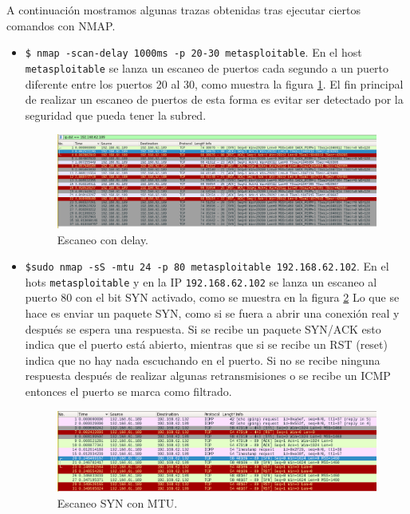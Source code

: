 \documentclass[a4,12pt,onecolum]{article}
\begin{document}
A continuación mostramos algunas trazas obtenidas tras ejecutar ciertos comandos con NMAP.

\begin{itemize}
  \item \texttt{\$ nmap -scan-delay 1000ms -p 20-30 metasploitable}. En el host \texttt{metasploitable} se lanza un escaneo de puertos cada segundo a un puerto diferente entre los puertos 20 al 30, como muestra la figura \ref{fig:nmap5}. El fin principal de realizar un escaneo de puertos de esta forma es evitar ser detectado por la seguridad que pueda tener la subred.

  \begin{figure}[htbp]
  \centering
  \includegraphics[width=1.0\textwidth]{./images/Atacante_wireshark_scaneo_delay.png}
  \caption{Escaneo con delay.}
  \label{fig:nmap5}
  \end{figure}

  \item \texttt{\$sudo nmap -sS -mtu 24 -p 80 metasploitable 192.168.62.102}. En el hots \texttt{metasploitable} y en la IP \texttt{192.168.62.102} se lanza un escaneo al puerto 80 con el bit SYN activado, como se muestra en la figura \ref{fig:nmap6} Lo que se hace es enviar un paquete SYN, como si se fuera a abrir una conexión real y después se espera una respuesta. Si se recibe un paquete SYN/ACK esto indica que el puerto está abierto, mientras que si se recibe un RST (reset) indica que no hay nada escuchando en el puerto. Si no se recibe ninguna respuesta después de realizar algunas retransmisiones o se recibe un ICMP entonces el puerto se marca como filtrado.

  \begin{figure}[htbp]
  \centering
  \includegraphics[width=1.0\textwidth]{./images/Atacante_wireshark_scaneo_mtu.png}
  \caption{Escaneo SYN con MTU.}
  \label{fig:nmap6}
  \end{figure}
\end{itemize}
\end{document}
